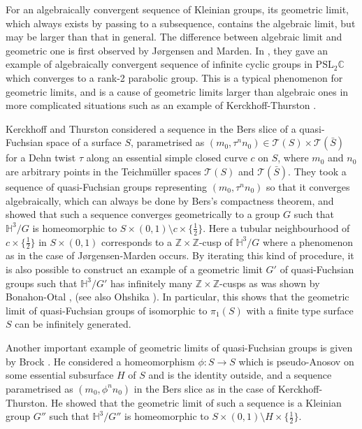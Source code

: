 \documentclass{amsart}
\theoremstyle{definition}
\numberwithin{figure}{section}
\numberwithin{equation}{section}
\newcommand{\blackboard}[1]{\ensuremath{\mathbb{#1}}}
\newcommand{\complexes}{\blackboard{C}}
\newcommand{\hyperbolic}{\blackboard{H}}
\newcommand{\integers}{\blackboard{Z}} %
\newcommand{\teich}{\mathcal{T}}
\newcommand{\PSL}{\ensuremath{\mathrm{PSL}}}
\def\hh{\hyperbolic}
\def\zz{\integers}
\begin{document}
For an algebraically convergent sequence of Kleinian groups, its geometric limit, which always exists by passing to a subsequence, contains the algebraic limit, but may be larger than that in general.
The difference between algebraic limit and geometric one is first observed by J{\o}rgensen and Marden.
In \cite{jm}, they gave an example of algebraically convergent sequence of infinite cyclic groups in $\PSL_2 \complexes$ which converges to a rank-2 parabolic group. 
This is a typical phenomenon for geometric limits, and is a cause of geometric limits larger than algebraic ones in more complicated situations such as an example of Kerckhoff-Thurston \cite{kt}.

Kerckhoff and Thurston considered a sequence in the Bers slice of a quasi-Fuchsian space of a surface $S$, parametrised as $(m_0, \tau^n n_0) \in \teich(S) \times \teich( \bar S)$  for a Dehn twist $\tau$ along an essential simple closed curve $c$ on $S$, where $m_0$ and $n_0$ are arbitrary points in the Teichm\"{u}ller spaces $\teich(S)$ and $\teich(\bar S)$.
They took a sequence of quasi-Fuchsian groups representing $(m_0, \tau^n n_0)$ so that it converges algebraically, which can always be done by Bers's compactness theorem, and  showed that such a sequence converges geometrically to a group $G$ such that $\hyperbolic^3/G$ is homeomorphic to $S\times (0,1) \setminus c\times \{\frac12\}$.
Here a tubular neighbourhood of $c\times \{\frac12\}$ in $S\times (0,1)$ corresponds to a $\zz\times \zz$-cusp of $\hh^3/G$ where a phenomenon as in the case of J{\o}rgensen-Marden  occurs.
By iterating this kind of procedure, it is also possible to construct an example of a geometric limit $G'$ of quasi-Fuchsian groups such that $\hh^3/G'$ has infinitely many $\zz\times \zz$-cusps as was shown by Bonahon-Otal \cite{BO}, (see also Ohshika \cite{oh1}).
In particular, this shows that the geometric limit of  quasi-Fuchsian groups of isomorphic to  $\pi_1(S)$ with a finite type surface $S$ can be  infinitely generated.

Another important example of geometric limits of quasi-Fuchsian groups is given by Brock \cite{br}.
He considered a homeomorphism $\phi: S \rightarrow S$ which is pseudo-Anosov on some essential subsurface $H$ of $S$ and is the identity outside, and a sequence parametrised as $(m_0, \phi^n n_0)$ in the Bers slice as in the case of Kerckhoff-Thurston.
He showed that the geometric limit of such a sequence is a Kleinian group $G''$ such that $\hh^3/G''$ is homeomorphic to $S\times (0,1)\setminus H\times \{\frac12\}$.
\end{document}
